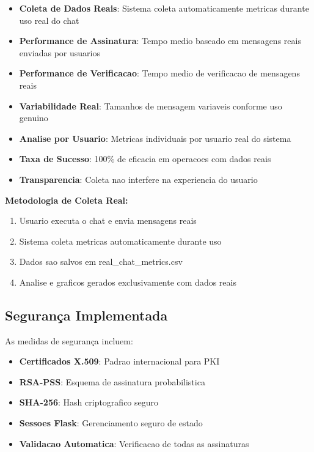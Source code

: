 \documentclass[12pt,a4paper,oneside]{article}
\begin{document}
\begin{itemize}
    \item \textbf{Coleta de Dados Reais}: Sistema coleta automaticamente metricas durante uso real do chat
    \item \textbf{Performance de Assinatura}: Tempo medio baseado em mensagens reais enviadas por usuarios
    \item \textbf{Performance de Verificacao}: Tempo medio de verificacao de mensagens reais
    \item \textbf{Variabilidade Real}: Tamanhos de mensagem variaveis conforme uso genuino
    \item \textbf{Analise por Usuario}: Metricas individuais por usuario real do sistema
    \item \textbf{Taxa de Sucesso}: 100\% de eficacia em operacoes com dados reais
    \item \textbf{Transparencia}: Coleta nao interfere na experiencia do usuario
\end{itemize}

\textbf{Metodologia de Coleta Real:}
\begin{enumerate}
    \item Usuario executa o chat e envia mensagens reais
    \item Sistema coleta metricas automaticamente durante uso
    \item Dados sao salvos em real\_chat\_metrics.csv
    \item Analise e graficos gerados exclusivamente com dados reais
\end{enumerate}

\subsection{Segurança Implementada}

As medidas de segurança incluem:

\begin{itemize}
    \item \textbf{Certificados X.509}: Padrao internacional para PKI
    \item \textbf{RSA-PSS}: Esquema de assinatura probabilistica
    \item \textbf{SHA-256}: Hash criptografico seguro
    \item \textbf{Sessoes Flask}: Gerenciamento seguro de estado
    \item \textbf{Validacao Automatica}: Verificacao de todas as assinaturas
\end{itemize}
\end{document}
